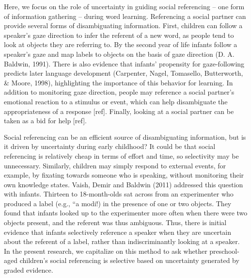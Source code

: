\documentclass[10pt, letterpaper]{article}
\begin{document}
Here, we focus on the role of uncertainty in guiding social referencing
-- one form of information gathering -- during word learning.
Referencing a social partner can provide several forms of disambiguating
information. First, children can follow a speaker's gaze direction to
infer the referent of a new word, as people tend to look at objects they
are referring to. By the second year of life infants follow a speaker's
gaze and map labels to objects on the basis of gaze direction (D. A.
Baldwin, 1991). There is also evidence that infants' propensity for
gaze-following predicts later language development (Carpenter, Nagel,
Tomasello, Butterworth, \& Moore, 1998), highlighting the importance of
this behavior for learning. In addition to monitoring gaze direction,
people may reference a social partner's emotional reaction to a stimulus
or event, which can help disambiguate the appropriateness of a response
{[}ref{]}. Finally, looking at a social partner can be taken as a bid
for help {[}ref{]}.

Social referencing can be an efficient source of disambiguating
information, but is it driven by uncertainty during early childhood? It
could be that social referencing is relatively cheap in terms of effort
and time, so selectivity may be unnecessary. Similarly, children may
simply respond to external events, for example, by fixating towards
someone who is speaking, without monitoring their own knowledge states.
Vaish, Demir and Baldwin (2011) addressed this question with infants.
Thirteen to 18-month-olds sat across from an experimenter who produced a
label (e.g., ``a modi!) in the presence of one or two objects. They
found that infants looked up to the experimenter more often when there
were two objects present, and the referent was thus ambiguous. Thus,
there is initial evidence that infants selectively reference a speaker
when they are uncertain about the referent of a label, rather than
indiscriminantly looking at a speaker. In the present research, we
capitalize on this method to ask whether preschool-aged children's
social referencing is selective based on uncertainty generated by graded
evidence.
\end{document}

